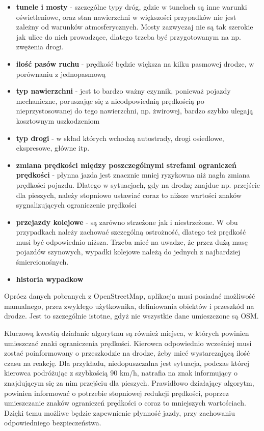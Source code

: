 \begin{itemize}
\item \textbf{tunele i mosty} - szczególne typy dróg, gdzie w tunelach są inne warunki oświetleniowe, oraz stan nawierzchni w większości przypadków nie jest zależny od warunków atmosferycznych. Mosty zazwyczaj nie są tak szerokie jak ulice do nich prowadzące, dlatego trzeba być przygotowanym na np. zwężenia drogi.
\item \textbf{ilość pasów ruchu} - prędkość będzie większa na kilku pasmowej drodze, w porównaniu z jednopasmową
\item \textbf{typ nawierzchni} - jest to bardzo ważny czynnik, ponieważ pojazdy mechaniczne, poruszając się z nieodpowiednią prędkością po nieprzystosowanej do tego nawierzchni, np. żwirowej, bardzo szybko ulegają kosztownym uszkodzeniom
\item \textbf{typ drogi} - w skład których wchodzą autostrady, drogi osiedlowe, ekspresowe, główne itp.
\item \textbf{zmiana prędkości między poszczególnymi strefami ograniczeń prędkości} - płynna jazda jest znacznie mniej ryzykowna niż nagła zmiana prędkości pojazdu. Dlatego w sytuacjach, gdy na drodzę znajdue np. przejście dla pieszych, należy stopniowo ustawiać coraz to niższe wartości znaków sygnalizujących ograniczenie prędkości
\item \textbf{przejazdy kolejowe} - są zarówno strzeżone jak i niestrzeżone. W obu przypadkach należy zachować szczególną ostrożność, dlatego też prędkość musi być odpowiednio niższa. Trzeba mieć na uwadze, że przez dużą masę pojazdów szynowych, wypadki kolejowe należą do jednych z najbardziej śmiercionośnych.
\item \textbf{historia wypadkow}
\end{itemize}

Oprócz danych pobranych z OpenStreetMap, aplikacja musi posiadać możliwość manualnego, przez zwykłego użytkownika, definiowania obiektów i przeszkód na drodze. Jest to szczególnie istotne, gdyż nie wszystkie dane umieszczone są OSM.


Kluczową kwestią działanie algorytmu są również miejsca, w których powinien umieszczać znaki ograniczenia prędkości. Kierowca odpowiednio wcześniej musi zostać poinformowany o przeszkodzie na drodze, żeby mieć wystarczającą ilość czasu na reakcję. Dla przykładu, niedopuszczalna jest sytuacja, podczas której kierowca podróżując z szybkością 90 km/h, natrafia na znak informujący o znajdującym się za nim przejściu dla pieszych. Prawidłowo działający algorytm, powinien informować o potrzebie stopniowej redukcji prędkości, poprzez umieszczanie znaków ograniczeń prędkości o coraz to mniejszych wartościach. Dzięki temu możliwe będzie zapewnienie płynność jazdy, przy zachowaniu odpowiedniego bezpieczeństwa.


